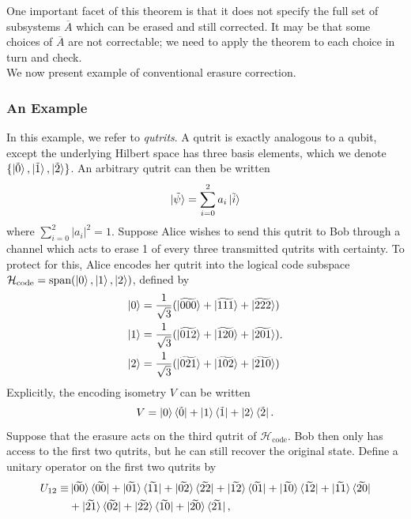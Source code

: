 \documentclass[12pt,a4paper]{report}
\numberwithin{equation}{section}
\newcommand{\ketbra}[2]{\ket{#1}\bra{#2}}
\newcommand{\ketbras}[1]{\ketbra{#1}{#1}}
\newcommand{\Hcode}{\mathcal{H}_{\text{code}}}
\newcommand{\ol}[1]{\overline{#1}}
\theoremstyle{definition}
\theoremstyle{theorem}
\theoremstyle{theorem}
\theoremstyle{example}
\theoremstyle{definition}
\begin{document}
One important facet of this theorem is that it does not specify the full set of subsystems $\ol{A}$ which can be erased and still corrected. It may be that some choices of $\ol{A}$ are not correctable; we need to apply the theorem to each choice in turn and check.\\
We now present example of conventional erasure correction.
\subsubsection{An Example}
In this example, we refer to \textit{qutrits}. A qutrit is exactly analogous to a qubit, except the underlying Hilbert space has three basis elements, which we denote $\{\ket{\tilde{0}},\ket{\tilde{1}},\ket{\tilde{2}}\}$. An arbitrary qutrit can then be written
\begin{equation}
	\ket{\tilde{\psi}}=\sum_{i=0}^{2}a_{i}\ket{\tilde{i}}
\end{equation}
where $\sum_{i=0}^{2}|a_{i}|^{2}=1$. Suppose Alice wishes to send this qutrit to Bob through a channel which acts to erase 1 of every three transmitted qutrits with certainty. To protect for this, Alice encodes her qutrit into the logical code subspace $\Hcode=\text{span}(\ket{0},\ket{1},\ket{2})$, defined by
\begin{equation}
	\begin{aligned}
		\ket{0}&=\frac{1}{\sqrt{3}}(\ket{\widetilde{000}}+\ket{\widetilde{111}}+\ket{\widetilde{222}})\\
		\ket{1}&=\frac{1}{\sqrt{3}}(\ket{\widetilde{012}}+\ket{\widetilde{120}}+\ket{\widetilde{201}})\\
		\ket{2}&=\frac{1}{\sqrt{3}}(\ket{\widetilde{021}}+\ket{\widetilde{102}}+\ket{\widetilde{210}})
	\end{aligned}.
\end{equation}
Explicitly, the encoding isometry $V$ can be written
\begin{equation}
	V=\ket{0}\bra{\tilde{0}}+\ket{1}\bra{\tilde{1}}+\ket{2}\bra{\tilde{2}}.
\end{equation}
Suppose that the erasure acts on the third qutrit of $\Hcode$. Bob then only has access to the first two qutrits, but he can still recover the original state. Define a unitary operator on the first two qutrits by
\begin{equation}\label{unitary}
	\begin{aligned}
		U_{12}\equiv&\ketbras{\widetilde{00}}+\ketbra{\widetilde{01}}{\widetilde{11}}+\ketbra{\widetilde{02}}{\widetilde{22}}+\ketbra{\widetilde{12}}{\widetilde{01}}+\ketbra{\widetilde{10}}{\widetilde{12}}+\ketbra{\widetilde{11}}{\widetilde{20}}\\&+\ketbra{\widetilde{21}}{\widetilde{02}}+\ketbra{\widetilde{22}}{\widetilde{10}}+\ketbra{\widetilde{20}}{\widetilde{21}},
	\end{aligned}
\end{equation}
\end{document}
